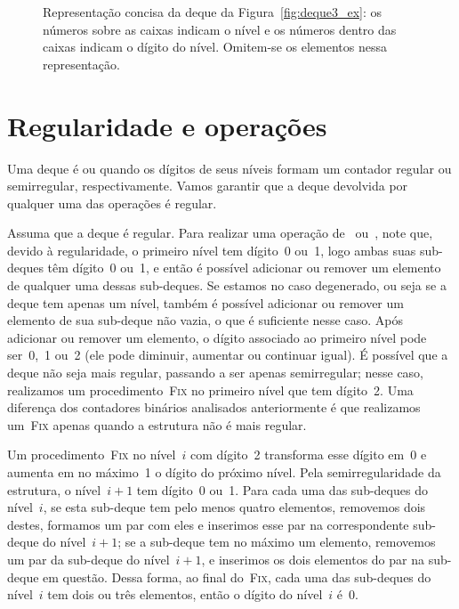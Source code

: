 \documentclass[main.tex]{subfiles}
\begin{document}
\begin{figure}
\centering
{}
\caption{Representação concisa da deque da Figura~\ref{fig:deque3_ex}: os números sobre as caixas indicam o nível e os números dentro das caixas indicam o dígito do nível. Omitem-se os elementos nessa representação.} \label{fig:deque3_ex2}
\end{figure}

\section{Regularidade e operações} \label{sec:reg_op}

Uma deque é  ou  quando os dígitos de seus níveis formam um contador regular ou semirregular, respectivamente. Vamos garantir que a deque devolvida por qualquer uma das operações é regular.

Assuma que a deque é regular. Para realizar uma operação de~ ou~, note que, devido à regularidade, o primeiro nível tem dígito~0 ou~1, logo ambas suas sub-deques têm dígito~0 ou~1, e então é possível adicionar ou remover um elemento de qualquer uma dessas sub-deques. Se estamos no caso degenerado, ou seja se a deque tem apenas um nível, também é possível adicionar ou remover um elemento de sua sub-deque não vazia, o que é suficiente nesse caso.
Após adicionar ou remover um elemento, o dígito associado ao primeiro nível pode ser~0,~1 ou~2 (ele pode diminuir, aumentar ou continuar igual). É possível que a deque não seja mais regular, passando a ser apenas semirregular; nesse caso, realizamos um procedimento~\textsc{Fix} no primeiro nível que tem dígito~2. Uma diferença dos contadores binários analisados anteriormente é que realizamos um~\textsc{Fix} apenas quando a estrutura não é mais regular.

Um procedimento~\textsc{Fix} no nível~$i$ com dígito~2 transforma esse dígito em~0 e aumenta em no máximo~1 o dígito do próximo nível. Pela semirregularidade da estrutura, o nível~$i+1$ tem dígito~0 ou~1. Para cada uma das sub-deques do nível~$i$, se esta sub-deque tem pelo menos quatro elementos, removemos dois destes, formamos um par com eles e inserimos esse par na correspondente sub-deque do nível~$i+1$; se a sub-deque tem no máximo um elemento, removemos um par da sub-deque do nível~$i+1$, e inserimos os dois elementos do par na sub-deque em questão. Dessa forma, ao final do~\textsc{Fix}, cada uma das sub-deques do nível~$i$ tem dois ou três elementos, então o dígito do nível~$i$ é~0.
\end{document}
